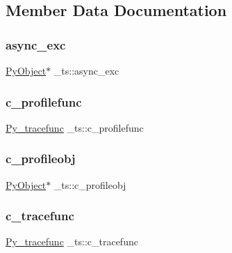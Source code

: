 \subsection{Member Data Documentation}
\mbox{\label{struct__ts_a5049998e3860dc12b7104a382cf404c0}} 
\subsubsection{\texorpdfstring{async\_exc}{async\_exc}}
{\footnotesize\ttfamily \mbox{\hyperlink{_python27_2object_8h_aadc84ac7aed2cfa6f20c25f62bf3dac7}{Py\+Object}}$\ast$ \+\_\+ts\+::async\+\_\+exc}

\mbox{\label{struct__ts_a354e6c632d0c7d71b95edfa41a304e94}} 
\subsubsection{\texorpdfstring{c\_profilefunc}{c\_profilefunc}}
{\footnotesize\ttfamily \mbox{\hyperlink{pystate_8h_ab5c10be1fd41472f8b22569c5f15f8e6}{Py\+\_\+tracefunc}} \+\_\+ts\+::c\+\_\+profilefunc}

\mbox{\label{struct__ts_a69de89b983a3a9a5f81bbf59eb27023d}} 
\subsubsection{\texorpdfstring{c\_profileobj}{c\_profileobj}}
{\footnotesize\ttfamily \mbox{\hyperlink{_python27_2object_8h_aadc84ac7aed2cfa6f20c25f62bf3dac7}{Py\+Object}}$\ast$ \+\_\+ts\+::c\+\_\+profileobj}

\mbox{\label{struct__ts_a62ef329915123042c2cb1a943e986e18}} 
\subsubsection{\texorpdfstring{c\_tracefunc}{c\_tracefunc}}
{\footnotesize\ttfamily \mbox{\hyperlink{pystate_8h_ab5c10be1fd41472f8b22569c5f15f8e6}{Py\+\_\+tracefunc}} \+\_\+ts\+::c\+\_\+tracefunc}

